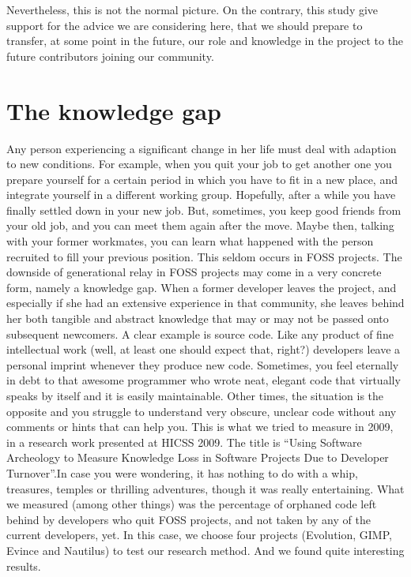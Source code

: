 Nevertheless, this is not the normal picture. On the contrary, this study give support for the advice we are considering here, that we should prepare to transfer, at some point in the future, our role and knowledge in the project to the future contributors joining our community.

\section*{The knowledge gap}

Any person experiencing a significant change in her life must deal with adaption to new conditions. For example, when you quit your job to get another one you prepare yourself for a certain period in which you have to fit in a new place, and integrate yourself in a different working group. Hopefully, after a while you have finally settled down in your new job. But, sometimes, you keep good friends from your old job, and you can meet them again after the move. Maybe then, talking with your former workmates, you can learn what happened with the person recruited to fill your previous position. This seldom occurs in FOSS projects.
The downside of generational relay in FOSS projects may come in a very concrete form, namely a knowledge gap. When a former developer leaves the project, and especially if she had an extensive experience in that community, she leaves behind her both tangible and abstract knowledge that may or may not be passed onto subsequent newcomers.
A clear example is source code. Like any product of fine intellectual work (well, at least one should expect that, right?) developers leave a personal imprint whenever they produce new code. Sometimes, you feel eternally in debt to that awesome programmer who wrote neat, elegant code that virtually speaks by itself and it is easily maintainable. Other times, the situation is the opposite and you struggle to understand very obscure, unclear code without any comments or hints that can help you.
This is what we tried to measure in 2009, in a research work presented at HICSS 2009. The title is ``Using Software Archeology to Measure Knowledge Loss in Software Projects Due to Developer Turnover''.In case you were wondering, it has nothing to do with a whip, treasures, temples or thrilling adventures, though it was really entertaining. What we measured (among other things) was the percentage of orphaned code left behind by developers who quit FOSS projects, and not taken by any of the current developers, yet. In this case, we choose four projects (Evolution, GIMP, Evince and Nautilus) to test our research method. And we found quite interesting results.
